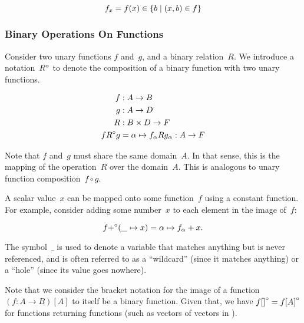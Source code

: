 \begin{equation}
  f_x = f(x) \in \left\{b \mid (x,b) \in f\right\}
\end{equation}


\subsubsection{Binary Operations On Functions}
Consider two unary functions $f$ and~$g$,
  and a binary relation~$R$.
We introduce a notation~${R}^\circ$ to denote the composition of a binary
  function with two unary functions.

\begin{align}
  f &: A \rightarrow B \\
  g &: A \rightarrow D \\
  R &: B\times D \rightarrow F \\
  f {R}^\circ g &= \alpha \mapsto f_\alpha R g_\alpha : A \rightarrow F
\end{align}

\indexsym{}
Note that $f$ and~$g$ must share the same domain~$A$.
In that sense,
  this is the mapping of the operation~$R$ over the domain~$A$.
This is analogous to unary function composition~$f\circ g$.

A scalar value~$x$ can be mapped onto some function~$f$ using a constant
  function.
For example,
  consider adding some number~$x$ to each element in the image of~$f$:

\begin{equation*}
  f {+}^\circ (\_\mapsto x) = \alpha \mapsto f_\alpha + x.
\end{equation*}

The symbol~$\_$ is used to denote a variable that matches anything but is
  never referenced,
    and is often referred to as a ``wildcard'' (since it matches anything)
    or a ``hole'' (since its value goes nowhere).

Note that we consider the bracket notation for the image of a function
  $(f:A\rightarrow B)[A]$ to itself be a binary function.
Given that, we have $f{[]}^\circ = f{[A]}^\circ$ for functions returning
  functions (such as vectors of vectors in ).


